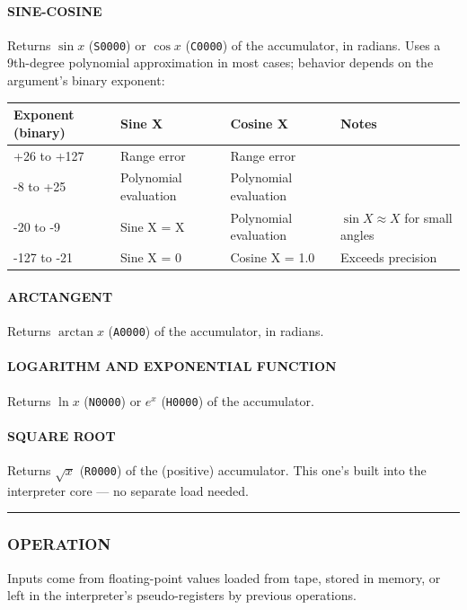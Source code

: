 \paragraph{SINE-COSINE}
Returns $\sin x$ (\texttt{S0000}) or $\cos x$ (\texttt{C0000}) of the accumulator, in radians. Uses a 9th-degree polynomial approximation in most cases; behavior depends on the argument's binary exponent:

\begin{center}
\small
\begin{tabularx}{\textwidth}{lllX}
\toprule
\textbf{Exponent (binary)} & \textbf{Sine X} & \textbf{Cosine X} & \textbf{Notes}\\
\midrule
+26 to +127 & Range error & Range error & \\
-8 to +25   & Polynomial evaluation & Polynomial evaluation & \\
-20 to -9   & Sine X = X & Polynomial evaluation & $\sin X \approx X$ for small angles \\
-127 to -21 & Sine X = 0 & Cosine X = 1.0 & Exceeds precision \\
\bottomrule
\end{tabularx}
\end{center}

\paragraph{ARCTANGENT}
Returns $\arctan x$ (\texttt{A0000}) of the accumulator, in radians.

\paragraph{LOGARITHM AND EXPONENTIAL FUNCTION}
Returns $\ln x$ (\texttt{N0000}) or $e^x$ (\texttt{H0000}) of the accumulator.

\paragraph{SQUARE ROOT}
Returns $\sqrt{x}$ (\texttt{R0000}) of the (positive) accumulator. This one's built into the interpreter core --- no separate load needed.

\bigskip
\hrule
\bigskip

\subsubsection*{OPERATION}
Inputs come from floating-point values loaded from tape, stored in memory, or left in the interpreter's pseudo-registers by previous operations.

